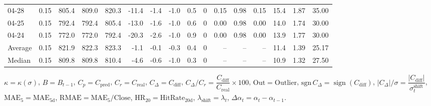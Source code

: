 \begin{threeparttable}
{\begin{tabular}{lrrrrrrrrrrrrrrr}
  04-28 &     0.15 & 805.4 & 809.0 & 820.3 &      -11.4 &           -1.4 &                     -1.0 &                 0.5 &              0 &       0.15 &      0.98 &           0.15 &             15.4 &            1.87 &                  35.00 \\
  04-25 &     0.15 & 792.4 & 792.4 & 805.4 &      -13.0 &           -1.6 &                     -1.0 &                 0.6 &              0 &       0.00 &      0.98 &           0.00 &             14.0 &            1.74 &                  30.00 \\
  04-24 &     0.15 & 772.0 & 772.0 & 792.4 &      -20.3 &           -2.6 &                     -1.0 &                 0.9 &              0 &       0.00 &      0.98 &           0.00 &             13.9 &            1.77 &                  30.00 \\
Average &     0.15 & 821.9 & 822.3 & 823.3 &       -1.1 &           -0.1 &                     -0.3 &                 0.4 &              0 &         -- &        -- &             -- &             11.4 &            1.39 &                  25.17 \\
 Median &     0.15 & 809.8 & 809.8 & 810.4 &       -4.6 &           -0.6 &                     -1.0 &                 0.3 &              0 &         -- &        -- &             -- &             10.9 &            1.32 &                  27.50 \\
\bottomrule
\end{tabular}
}
\begin{tablenotes}\footnotesize
\item $\kappa=\kappa(\sigma)$, $B=B_{t-1}$, $C_p=C_{\text{pred}}$, $C_r=C_{\text{real}}$, $C_\Delta=C_{\text{diff}}$, $C_\Delta/C_r=\dfrac{C_{\text{diff}}}{C_{\text{real}}}\times100$, $\mathrm{Out}=\text{Outlier}$, $\mathrm{sgn}\,C_\Delta=\operatorname{sign}(C_{\text{diff}})$, $|C_\Delta|/\sigma=\dfrac{|C_{\text{diff}}|}{\sigma_t^{\text{shift}}}$, $\mathrm{MAE}_5=\mathrm{MAE}_{5\text{d}}$, $\mathrm{RMAE}= \mathrm{MAE}_5 / \text{Close}$, $\mathrm{HR}_{20}=\mathrm{HitRate}_{20\text{d}}$, 
$\lambda_{\text{shift}}=\lambda_t$, 
$\Delta\alpha_t=\alpha_t-\alpha_{t-1}$.
\end{tablenotes}
\end{threeparttable}
\endgroup

